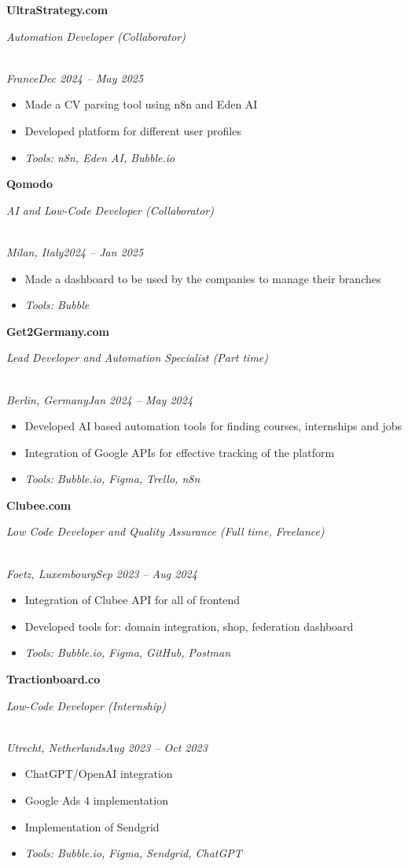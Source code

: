 \documentclass[a4paper,10pt]{article}
\newcommand{\role}[4]{\vspace{3pt}\noindent\hspace{0.6em}\parbox[t]{0.38\textwidth}{\raggedright\textbf{#1}}\hfill\parbox[t]{0.58\textwidth}{\raggedleft\textit{#2}}\\{\textit{#3}\hfill\textit{#4}}\vspace{1pt}}
\begin{document}
\role{UltraStrategy.com}{Automation Developer (Collaborator)}{France}{Dec 2024 -- May 2025}
\begin{itemize}
\item Made a CV parsing tool using n8n and Eden AI
\item Developed platform for different user profiles
\item \textit{Tools: n8n, Eden AI, Bubble.io}
\end{itemize}

\role{Qomodo}{AI and Low-Code Developer (Collaborator)}{Milan, Italy}{2024 -- Jan 2025}
\begin{itemize}
\item Made a dashboard to be used by the companies to manage their branches
\item \textit{Tools: Bubble}
\end{itemize}

\role{Get2Germany.com}{Lead Developer and Automation Specialist (Part time)}{Berlin, Germany}{Jan 2024 -- May 2024}
\begin{itemize}
\item Developed AI based automation tools for finding courses, internships and jobs
\item Integration of Google APIs for effective tracking of the platform
\item \textit{Tools: Bubble.io, Figma, Trello, n8n}
\end{itemize}

\role{Clubee.com}{Low Code Developer and Quality Assurance (Full time, Freelance)}{Foetz, Luxembourg}{Sep 2023 -- Aug 2024}
\begin{itemize}
\item Integration of Clubee API for all of frontend
\item Developed tools for: domain integration, shop, federation dashboard
\item \textit{Tools: Bubble.io, Figma, GitHub, Postman}
\end{itemize}

\role{Tractionboard.co}{Low-Code Developer (Internship)}{Utrecht, Netherlands}{Aug 2023 -- Oct 2023}
\begin{itemize}
\item ChatGPT/OpenAI integration
\item Google Ads 4 implementation
\item Implementation of Sendgrid
\item \textit{Tools: Bubble.io, Figma, Sendgrid, ChatGPT}
\end{itemize}
\end{document}
